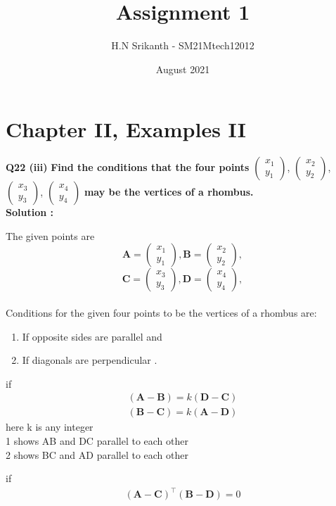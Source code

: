 \documentclass{article}
\title{\textbf{\Huge Assignment 1}}
\author{\large H.N Srikanth - SM21Mtech12012}
\date{August 2021}
\begin{document}
\providecommand{\mbf}{\mathbf}

\newcommand{\myvec}[1]{\ensuremath{\begin{pmatrix}#1\end{pmatrix}}}
\let\vec\mathbf

\maketitle

\section*{Chapter II, Examples II}
\textbf{Q22 (iii)}
\textbf{Find the conditions that the four points}
\myvec{x_1\\y_1}, \myvec{x_2\\y_2},
\myvec{x_3\\y_3}, \myvec{x_4\\y_4}
\textbf{ may be the vertices of a rhombus.}\\

\textbf{Solution :}

The given points are\\

$$\vec{A} = \myvec{x_1\\y_1}, \vec{B} =\myvec{x_2\\y_2},$$
$$\vec{C} =\myvec{x_3\\y_3}, \vec{D} =\myvec{x_4\\y_4},$$\\

Conditions for the given four points to be the vertices of a rhombus are:
\begin{enumerate}
  \item If opposite sides are parallel and
  \item If diagonals are perpendicular .
\end{enumerate}

if
\begin{align}
(\vec{A}-\vec{B} ) = k(\vec{D}-\vec{C} )\\
(\vec{B}-\vec{C} )=k(\vec{A}-\vec{D} )
\end{align}
here k is any integer\\
{1 shows AB and DC parallel to each other}\\
{2 shows BC and AD parallel to each other}

if 
\begin{align}
(\vec{A}-\vec{C} )^ \top ( \vec{B}-\vec{D} ) = 0 
\end{align}
\end{document}
